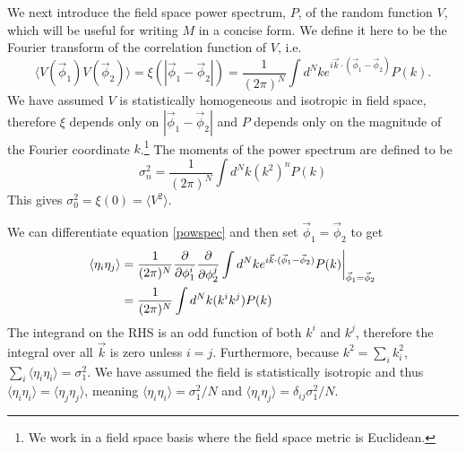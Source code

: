 \documentclass[12pt]{article}
\begin{document}
We next introduce the field space power spectrum, $P$, of the random function $V$, which will be useful for writing $M$ in a concise form. We define it here to be the Fourier transform of the correlation function of $V$, i.e.
%
\begin{equation}\label{powspec}
\langle V(\vec{\phi}_1) V(\vec{\phi}_2) \rangle = \xi(|\vec{\phi}_1-\vec{\phi}_2|)= \frac{1}{(2\pi)^N} \int d^Nk e^{i \vec{k} \cdot (\vec{\phi}_1-\vec{\phi}_2)} P(k).
\end{equation}
%
We have assumed $V$ is statistically homogeneous and isotropic in field space, therefore $\xi$ depends only on $|\vec{\phi}_1-\vec{\phi}_2|$ and  $P$ depends only on the magnitude of the Fourier coordinate $k$.\footnote{We work in a field space basis where the field space metric is Euclidean.} The moments of the power spectrum are defined to be
%
\begin{equation} \label{moments}
\sigma_n^2 = \frac{1}{(2\pi)^N}\int d^Nk (k^{2})^n P(k)
\end{equation}
%
This gives $\sigma_0^2=\xi(0)=\langle V^2 \rangle$.

We can differentiate equation \eqref{powspec} and then set $\vec{\phi}_1 = \vec{\phi}_2$ to get
%
\begin{align*}
\langle \eta_{i}\eta_{j}\rangle &= \frac{1}{(2\pi)^N} \frac{\partial}{\partial \phi_1^i}\frac{\partial}{\partial \phi_2^j} \int d^Nk e^{i \vec{k} \cdot (\vec{\phi}_1-\vec{\phi}_2)} P(k)\bigg{|}_{\vec{\phi}_1=\vec{\phi}_2}\\
&= \frac{1}{(2\pi)^N}\int d^Nk (k^i k^j) P(k)
\end{align*}
%
The integrand on the RHS is an odd function of both $k^i$ and $k^j$, therefore the integral over all $\vec{k}$ is zero unless $i=j$. Furthermore, because $k^2 = \sum_i k_i^2$,  $\sum_i \langle \eta_{i}\eta_{i}\rangle = \sigma_1^2$. We have assumed the field is statistically isotropic and thus $\langle \eta_{i}\eta_{i}\rangle=\langle \eta_{j}\eta_{j}\rangle$, meaning $\langle \eta_{i}\eta_{i}\rangle=\sigma_1^2/N$ and $\langle \eta_{i}\eta_{j}\rangle=\delta_{ij}\sigma_1^2/N$.

\end{document}
